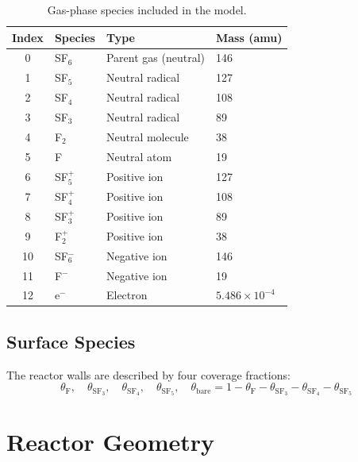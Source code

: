 \documentclass[11pt,a4paper]{article}
\begin{document}
\begin{table}[h]
\centering
\begin{tabular}{clll}
\toprule
\textbf{Index} & \textbf{Species} & \textbf{Type} & \textbf{Mass (amu)} \\
\midrule
0  & SF$_6$   & Parent gas (neutral) & 146 \\
1  & SF$_5$   & Neutral radical      & 127 \\
2  & SF$_4$   & Neutral radical      & 108 \\
3  & SF$_3$   & Neutral radical      & 89 \\
4  & F$_2$    & Neutral molecule     & 38 \\
5  & F        & Neutral atom         & 19 \\
6  & SF$_5^+$ & Positive ion         & 127 \\
7  & SF$_4^+$ & Positive ion         & 108 \\
8  & SF$_3^+$ & Positive ion         & 89 \\
9  & F$_2^+$  & Positive ion         & 38 \\
10 & SF$_6^-$ & Negative ion         & 146 \\
11 & F$^-$    & Negative ion         & 19 \\
12 & e$^-$    & Electron             & $5.486\times10^{-4}$ \\
\bottomrule
\end{tabular}
\caption{Gas-phase species included in the model.}
\end{table}

\subsection{Surface Species}

The reactor walls are described by four coverage fractions:
\begin{equation}
  \theta_\text{F},\quad \theta_\text{SF}_3,\quad \theta_\text{SF}_4,\quad \theta_\text{SF}_5,\quad
  \theta_\text{bare} = 1 - \theta_\text{F} - \theta_{\text{SF}_3} - \theta_{\text{SF}_4} - \theta_{\text{SF}_5}
\end{equation}

\section{Reactor Geometry}
\end{document}
